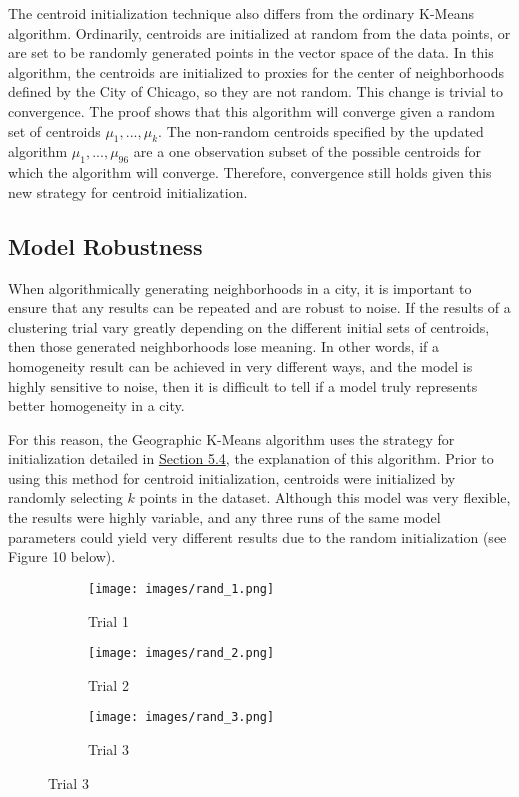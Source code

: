 \documentclass[times new roman,12pt]{article}
\begin{document}
The centroid initialization technique also differs from the ordinary K-Means algorithm. Ordinarily, centroids are initialized at random from the data points, or are set to be randomly generated points in the vector space of the data. In this algorithm, the centroids are initialized to proxies for the center of neighborhoods defined by the City of Chicago, so they are not random. This change is trivial to convergence. The proof shows that this algorithm will converge given a random set of centroids $\mu_1,...,\mu_k$. The non-random centroids specified by the updated algorithm $\mu_1,...,\mu_{96}$ are a one observation subset of the possible centroids for which the algorithm will converge. Therefore, convergence still holds given this new strategy for centroid initialization. 

\subsection{Model Robustness}
\label{repeatability}

When algorithmically generating neighborhoods in a city, it is important to ensure that any results can be repeated and are robust to noise. If the results of a clustering trial vary greatly depending on the different initial sets of centroids, then those generated neighborhoods lose meaning. In other words, if a homogeneity result can be achieved in very different ways, and the model is highly sensitive to noise, then it is difficult to tell if a model truly represents better homogeneity in a city. 

For this reason, the Geographic K-Means algorithm uses the strategy for initialization detailed in \hyperref[algo]{Section 5.4}, the explanation of this algorithm. Prior to using this method for centroid initialization, centroids were initialized by randomly selecting $k$ points in the dataset. Although this model was very flexible, the results were highly variable, and any three runs of the same model parameters could yield very different results due to the random initialization (see Figure 10 below). 

\vspace{4mm}

\begin{figure}[H]
\centering
\caption{High Variability, Lack of Robustness in Early Models}
\begin{subfigure}[t]{.31\textwidth}
\centering
  \texttt{[image: images/rand\_1.png]}
  \caption{Trial 1}
  \label{fig:rand_1}
\end{subfigure}%
\begin{subfigure}[t]{.31\textwidth}
\centering
  \texttt{[image: images/rand\_2.png]}
  \caption{Trial 2}
  \label{fig:rand_2}
\end{subfigure}%
\begin{subfigure}[t]{.31\textwidth}
\centering
  \texttt{[image: images/rand\_3.png]}
  \caption{Trial 3}
  \label{fig:rand_3}
\end{subfigure}%
\end{figure}
\end{document}
